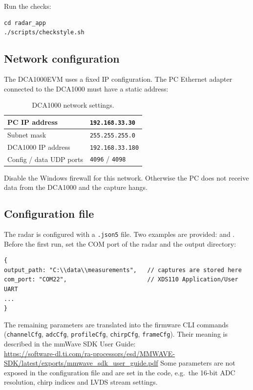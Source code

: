 \documentclass[12pt, a4paper]{article}
\begin{document}
Run the checks:
\begin{lstlisting}
cd radar_app
./scripts/checkstyle.sh
\end{lstlisting}




\newpage
\subsection{Network configuration}

The DCA1000EVM uses a fixed IP configuration. The PC Ethernet adapter connected to
the DCA1000 must have a static address:

\begin{table}[H]
\centering
\caption{DCA1000 network settings.}
\begin{tabular}{|l|l|}
\hline
PC IP address & \texttt{192.168.33.30} \\
\hline
Subnet mask & \texttt{255.255.255.0} \\
\hline
DCA1000 IP address & \texttt{192.168.33.180} \\
\hline
Config / data UDP ports & \texttt{4096} / \texttt{4098} \\
\hline
\end{tabular}
\end{table}

\begin{important}
Disable the Windows firewall for this network.
Otherwise the PC does not receive data from the DCA1000 and the capture hangs.
\end{important}



\subsection{Configuration file}

The radar is configured with a \texttt{.json5} file. Two examples are provided:
 and .
Before the first run, set the COM port of the radar and the output directory:

\begin{lstlisting}[language=json5]
{
output_path: "C:\\data\\measurements",   // captures are stored here
com_port: "COM22",                       // XDS110 Application/User UART
...
}
\end{lstlisting}

\noindent
The remaining parameters are translated into the firmware CLI commands\\
(\texttt{channelCfg}, \texttt{adcCfg}, \texttt{profileCfg}, \texttt{chirpCfg},
\texttt{frameCfg}). Their meaning is described in the mmWave SDK User Guide:\\
\url{https://software-dl.ti.com/ra-processors/esd/MMWAVE-SDK/latest/exports/mmwave_sdk_user_guide.pdf}
\noindent
Some parameters are not exposed in the configuration file and are set in the code, e.g.\ the 16-bit ADC resolution, chirp indices and LVDS stream settings.
\end{document}
